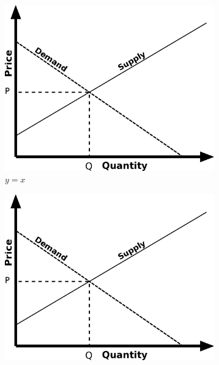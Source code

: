 \documentclass[Theme1]{{template_material/eurostat}}
\begin{document}
\begin{figure}[h]
    \caption{Three simple graphs}
    \label{fig:three graphs}
     \centering
     \begin{subfigure}[b]{0.3\textwidth}
         \centering
         \includegraphics[width=\textwidth]{template_material/FiguresFiles/Simple_supply_and_demand.svg.png}
         \caption{$y=x$}
         \label{fig:y equals x}
     \end{subfigure}
     \hfill
     \begin{subfigure}[b]{0.3\textwidth}
         \centering
         \includegraphics[width=\textwidth]{template_material/FiguresFiles/Simple_supply_and_demand.svg.png}

\end{subfigure}
\end{figure}
\end{document}
